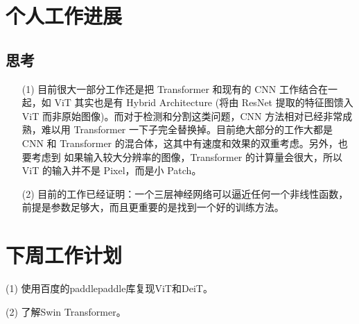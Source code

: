 \documentclass[letterpaper,10pt]{article}
\begin{document}
	\section{个人工作进展}
	
	\subsection{思考}
	
	\begin{itemize}
		\item [(1)] 目前很大一部分工作还是把 Transformer 和现有的 CNN 工作结合在一起，如 ViT 其实也是有 Hybrid Architecture (将由 ResNet 提取的特征图馈入 ViT 而非原始图像)。而对于检测和分割这类问题，CNN 方法相对已经非常成熟，难以用 Transformer 一下子完全替换掉。目前绝大部分的工作大都是 CNN 和 Transformer 的混合体，这其中有速度和效果的双重考虑。另外，也要考虑到 如果输入较大分辨率的图像，Transformer 的计算量会很大，所以 ViT 的输入并不是 Pixel，而是小 Patch。
		
		\item [(2)] 目前的工作已经证明：一个三层神经网络可以逼近任何一个非线性函数，前提是参数足够大，而且更重要的是找到一个好的训练方法。
		
	\end{itemize}

	
	\section{下周工作计划}
	
	(1) 使用百度的paddlepaddle库复现ViT和DeiT。
	
	(2) 了解Swin Transformer。
	
	
\end{document}
